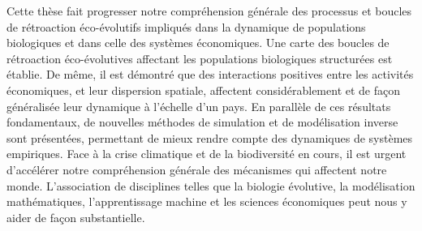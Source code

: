 {Cette thèse fait progresser notre compréhension générale des processus et boucles de rétroaction éco-évolutifs impliqués dans la dynamique de populations biologiques et dans celle des systèmes économiques. Une carte des boucles de rétroaction éco-évolutives affectant les populations biologiques structurées est établie. De même, il est démontré que des interactions positives entre les activités économiques, et leur dispersion spatiale, affectent considérablement et de façon généralisée leur dynamique à l'échelle d'un pays. En parallèle de ces résultats fondamentaux, de nouvelles méthodes de simulation et de modélisation inverse sont présentées, permettant de mieux rendre compte des dynamiques de systèmes empiriques. Face à la crise climatique et de la biodiversité en cours, il est urgent d'accélérer notre compréhension générale des mécanismes qui affectent notre monde. L'association de disciplines telles que la biologie évolutive, la modélisation mathématiques, l'apprentissage machine et les sciences économiques peut nous y aider de façon substantielle.}

